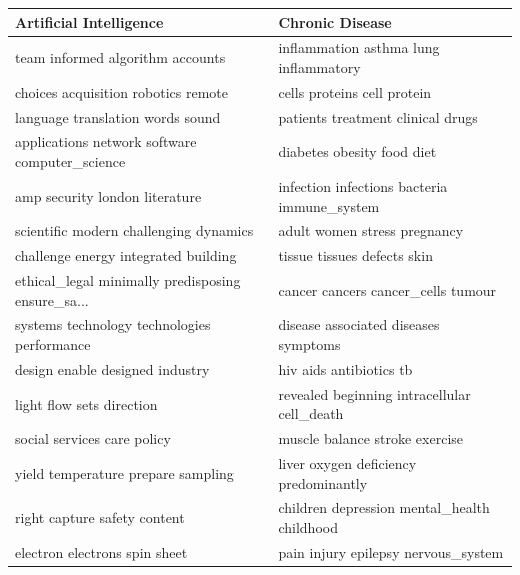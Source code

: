 \documentclass[11pt]{article}
\begin{document}
\begin{table}
\centering
\small
\begin{tabular}{ll}
\toprule
                                                Artificial Intelligence &                                            Chronic Disease \\
\hline                                                
\midrule
                  team informed algorithm accounts &              inflammation asthma lung inflammatory \\
               choices acquisition robotics remote &                        cells proteins cell protein \\
                  language translation words sound &                  patients treatment clinical drugs \\
    applications network software computer\_science &                         diabetes obesity food diet \\
                    amp security london literature &        infection infections bacteria immune\_system \\
            scientific modern challenging dynamics &                       adult women stress pregnancy \\
              challenge energy integrated building &                        tissue tissues defects skin \\
 ethical\_legal minimally predisposing ensure\_sa... &                 cancer cancers cancer\_cells tumour \\
       systems technology technologies performance &               disease associated diseases symptoms \\
                   design enable designed industry &                            hiv aids antibiotics tb \\
                         light flow sets direction &        revealed beginning intracellular cell\_death \\
                       social services care policy &                     muscle balance stroke exercise \\
                yield temperature prepare sampling &              liver oxygen deficiency predominantly \\
                      right capture safety content &        children depression mental\_health childhood \\
                     electron electrons spin sheet &                pain injury epilepsy nervous\_system \\

\end{tabular}
\end{table}
\end{document}
